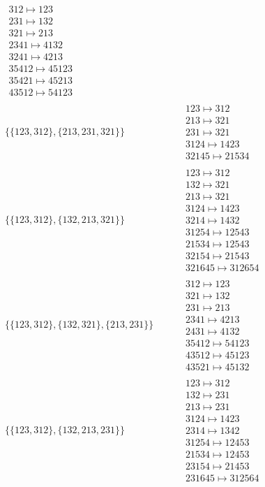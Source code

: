 \begin{tiny}
\begin{align}
\begin{matrix}
312 \mapsto 123\\231 \mapsto 132\\321 \mapsto 213\\2341 \mapsto 4132\\3241 \mapsto 4213\\35412 \mapsto 45123\\35421 \mapsto 45213\\43512 \mapsto 54123
\end{matrix}
\\
\{\{123, 312\}, \{213, 231, 321\}\}
\quad
&
\phantom{.}
&
\begin{matrix}
123 \mapsto 312\\213 \mapsto 321\\231 \mapsto 321\\3124 \mapsto 1423\\32145 \mapsto 21534
\end{matrix}
\\
\{\{123, 312\}, \{132, 213, 321\}\}
\quad
&
\phantom{.}
&
\begin{matrix}
123 \mapsto 312\\132 \mapsto 321\\213 \mapsto 321\\3124 \mapsto 1423\\3214 \mapsto 1432\\31254 \mapsto 12543\\21534 \mapsto 12543\\32154 \mapsto 21543\\321645 \mapsto 312654
\end{matrix}
\\
\{\{123, 312\}, \{132, 321\}, \{213, 231\}\}
\quad
&
\phantom{.}
&
\begin{matrix}
312 \mapsto 123\\321 \mapsto 132\\231 \mapsto 213\\2341 \mapsto 4213\\2431 \mapsto 4132\\35412 \mapsto 54123\\43512 \mapsto 45123\\43521 \mapsto 45132
\end{matrix}
\\
\{\{123, 312\}, \{132, 213, 231\}\}
\quad
&
\phantom{.}
&
\begin{matrix}
123 \mapsto 312\\132 \mapsto 231\\213 \mapsto 231\\3124 \mapsto 1423\\2314 \mapsto 1342\\31254 \mapsto 12453\\21534 \mapsto 12453\\23154 \mapsto 21453\\231645 \mapsto 312564

\end{matrix}
\end{align}
\end{tiny}
